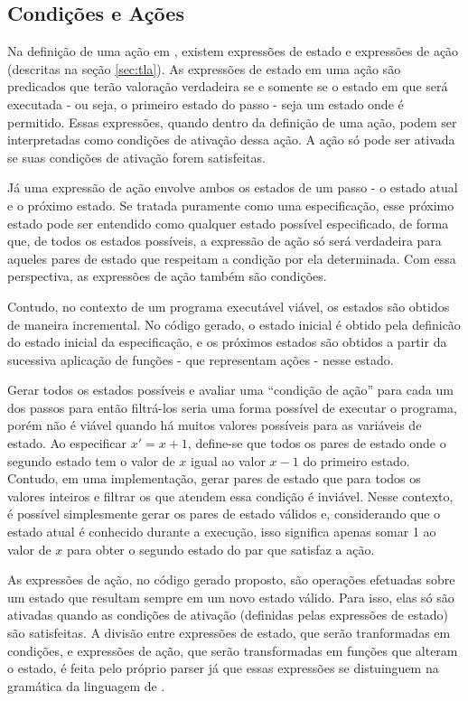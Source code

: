 \subsection{Condições e Ações}
\label{sec:condicoes}

Na definição de uma ação em \TLAA, existem expressões de estado e expressões de
ação (descritas na seção \ref{sec:tla}). As expressões de estado em uma ação
\FANCYA são predicados que terão valoração verdadeira se e somente se o estado em que \FANCYA
será executada - ou seja, o primeiro estado do passo - seja um estado onde
\FANCYA é permitido. Essas expressões, quando dentro da definição de uma ação,
podem ser interpretadas como condições de ativação dessa ação. A ação só pode ser ativada
se suas condições de ativação forem satisfeitas.

Já uma expressão de ação envolve ambos os estados de um passo - o estado atual e
o próximo estado. Se tratada puramente como uma especificação, esse próximo
estado pode ser entendido como qualquer estado possível especificado, de forma
que, de todos os estados possíveis, a expressão de ação só será verdadeira para
aqueles pares de estado que respeitam a condição por ela determinada. Com essa
perspectiva, as expressões de ação também são condições.

Contudo, no contexto de um programa executável viável, os estados são obtidos de
maneira incremental. No código gerado, o estado inicial é obtido pela definicão
do estado inicial da especificação, e os próximos estados são obtidos a partir
da sucessiva aplicação de funções - que representam ações - nesse estado.

Gerar todos os estados possíveis e avaliar uma ``condição de ação'' para cada um dos
passos para então filtrá-los seria uma forma possível de executar o programa, porém
não é viável quando há muitos valores possíveis para as variáveis de estado. Ao
especificar $x' = x + 1$, define-se que todos os pares de estado onde o segundo estado tem o
valor de $x$ igual ao valor $x - 1$ do primeiro estado. Contudo, em uma
implementação, gerar pares de estado que para todos os valores
inteiros e filtrar os que atendem essa condição é
inviável. Nesse contexto, é possível simplesmente gerar os pares de estado válidos e,
considerando que o estado atual é conhecido durante a execução, isso significa apenas
somar 1 ao valor de $x$ para obter o segundo estado do par que satisfaz a ação.

As expressões de ação, no código gerado proposto, são operações efetuadas sobre
um estado que resultam sempre em um novo estado válido. Para isso, elas só são
ativadas quando as condições de ativação (definidas pelas expressões
de estado) são satisfeitas. A divisão
entre expressões de estado, que serão tranformadas em condições, e expressões de
ação, que serão transformadas em funções que alteram o estado, é feita pelo
próprio parser já que essas expressões se distuinguem na gramática da linguagem
de \TLAA.

